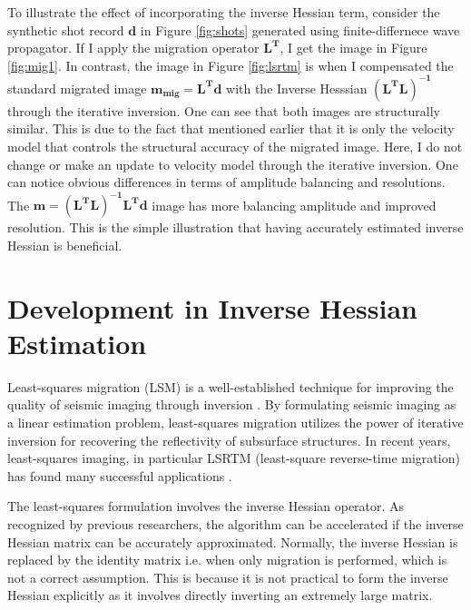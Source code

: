 



To illustrate the effect of incorporating the inverse Hessian term, consider the synthetic shot record $\mathbf{d}$ in Figure \ref{fig:shots} generated using finite-differnece wave propagator. If I apply the migration operator $\mathbf{L^T}$, I get the image in Figure \ref{fig:mig1}. In contrast, the image in Figure \ref{fig:lsrtm} is when I compensated the standard migrated image $\mathbf{m_{mig} = L^{T}d }$ with the Inverse Hesssian $\mathbf{(L^{T}L)^{-1}}$ through the iterative inversion. One can see that both images are structurally similar. This is due to the fact that mentioned earlier that it is only the velocity model that controls the structural accuracy of the migrated image. Here, I do not change or make an update to velocity model through the iterative inversion. One can notice obvious differences in terms of amplitude balancing and resolutions. The $\mathbf{m = (L^{T}L)^{-1} L^{T} d}$ image has more balancing amplitude and improved resolution. This is the simple illustration that having accurately estimated inverse Hessian is beneficial.


\section{Development in Inverse Hessian Estimation}

Least-squares migration (LSM) is a well-established technique for improving the quality of seismic imaging through inversion \cite[]{nemeth,ronen}. By formulating seismic imaging as a linear estimation problem, least-squares migration utilizes the power of iterative inversion for recovering the reflectivity of subsurface structures. In recent years, least-squares imaging, in particular LSRTM (least-square reverse-time migration) has found many successful applications \cite[]{dai,wang,wong}.

The least-squares formulation involves the inverse Hessian operator. As recognized by previous researchers, the algorithm can be accelerated if the inverse Hessian matrix can be accurately approximated. Normally, the inverse Hessian is replaced by the identity matrix i.e. when only migration is performed, which is not a correct assumption. This is because it is not practical to form the inverse Hessian explicitly as it involves directly inverting an extremely large matrix.

